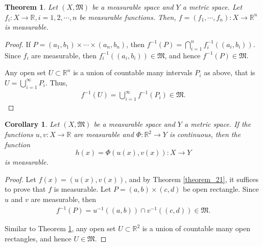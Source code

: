 \documentclass[11pt]{book}
\newtheorem{theorem}{Theorem}[chapter]
\newtheorem{corollary}{Corollary}[theorem]
\theoremstyle{definition}
\numberwithin{equation}{chapter}
\begin{document}
\medskip

\begin{theorem}\label{theorem_22}
Let $(X,\mathfrak{M})$ be a measurable space and $Y$ a metric space. Let $f_i: X \to \mathbb{R}, i = 1,2,\cdots,n$ be measurable functions. Then, $f = (f_1,\cdots,f_n):X\to\mathbb{R}^n$ is measurable.
\end{theorem}
\begin{proof}
If $P = (a_1,b_1)\times\cdots\times(a_n,b_n)$, then $f^{-1}(P) = \bigcap^n_{i=1} f_i^{-1}((a_i,b_i))$. Since $f_i$ are measurable, then $f_i^{-1}((a_i,b_i)) \in \mathfrak{M}$, and hence $f^{-1}(P) \in \mathfrak{M}$. 

Any open set $U \subset \mathbb{R}^n$ is a union of countable many intervals $P_i$ as above, that is $U = \bigcup^\infty_{i=1} P_i$. Thus, 
\begin{align*}
    f^{-1}(U) = \bigcup^\infty_{i=1} f^{-1}(P_i) \in \mathfrak{M}.
\end{align*}
\end{proof}

\medskip

\begin{corollary}
Let $(X,\mathfrak{M})$ be a measurable space and $Y$ a metric space. If the functions $u,v:X\to\mathbb{R}$ are measurable and $\Phi:\mathbb{R}^2 \to Y$ is continuous, then the function
$$h(x) = \Phi(u(x),v(x)): X \to Y$$
is measurable.
\end{corollary}
\begin{proof}
Let $f(x) = (u(x),v(x))$, and by Theorem \ref{theorem_21}, it suffices to prove that $f$ is measurable. Let $P = (a,b) \times (c,d)$ be open rectangle. Since $u$ and $v$ are measurable, then
\begin{align*}
    f^{-1}(P) = u^{-1}((a,b)) \cap v^{-1}((c,d)) \in \mathfrak{M}.
\end{align*}

Similar to Theorem \ref{theorem_22}, any open set $U \subset \mathbb{R}^2$ is a union of countable many open rectangles, and hence $U \in \mathfrak{M}$.
\end{proof}

\medskip
\end{document}
